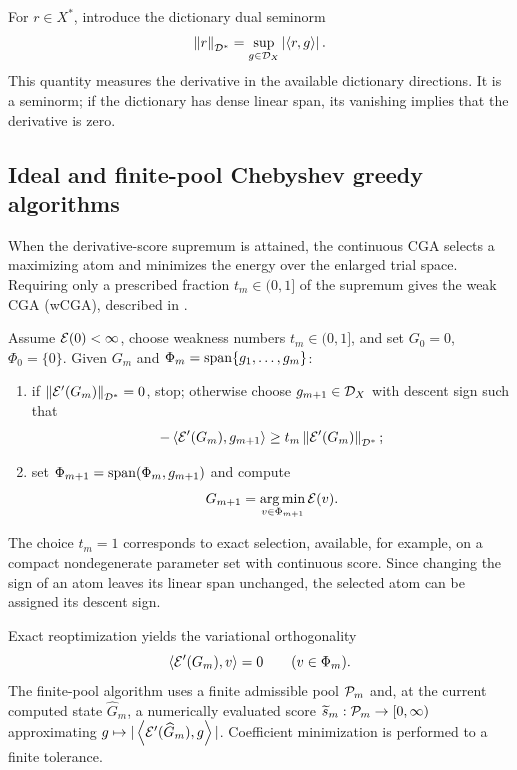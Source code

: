 For \(r\in X^*\), introduce the dictionary dual seminorm
\[
  \left\lVert r\right\rVert_{\mathcal{D}^*}=\sup_{g\in\mathcal{D}_X}\left|\left\langle r,g\right\rangle\right|.
\]
This quantity measures the derivative in the available dictionary directions. It is a seminorm;
if the dictionary has dense linear span, its vanishing implies that the derivative is zero.

\subsection{Ideal and finite-pool Chebyshev greedy algorithms}

When the derivative-score supremum is attained, the continuous CGA
selects a maximizing atom and minimizes the energy over the enlarged
trial space. Requiring only a prescribed fraction \(t_m\in(0,1]\) of
the supremum gives the weak CGA (wCGA), described in
.

\begin{algorithm}[htbp]
\caption{Continuous weak Chebyshev greedy algorithm}
\label{alg:continuous}
Assume \(\mathcal{E}(0)<\infty\), choose weakness numbers \(t_m\in(0,1]\), and set
\(G_0=0\), \(\Phi_0=\{0\}\). Given
\(G_m\) and \(\Phi_m=\operatorname{span}\{g_1,\ldots,g_m\}\):
\begin{enumerate}[label=\textup{(\roman*)}]
  \item if \(\left\lVert \mathcal{E}'(G_m)\right\rVert_{\mathcal{D}^*}=0\), stop; otherwise choose \(g_{m+1}\in\mathcal{D}_X\) with descent sign such that
  \[
  -\left\langle \mathcal{E}'(G_m),g_{m+1}\right\rangle
  \geq t_m\left\lVert \mathcal{E}'(G_m)\right\rVert_{\mathcal{D}^*};
  \]
  \item set \(\Phi_{m+1}=\operatorname{span}(\Phi_m,g_{m+1})\) and compute
  \[
    G_{m+1}=\operatorname*{arg\,min}_{v\in\Phi_{m+1}}\mathcal{E}(v).
  \]
\end{enumerate}
\end{algorithm}

The choice \(t_m=1\) corresponds to exact selection, available, for
example, on a compact nondegenerate parameter set with continuous
score. Since changing the sign of an atom leaves its linear span
unchanged, the selected atom can be assigned its descent sign.

Exact reoptimization yields the variational orthogonality
\begin{equation}
 \left\langle \mathcal{E}'(G_m),v\right\rangle=0\qquad(v\in\Phi_m).
 \label{eq:orthogonality}
\end{equation}
The finite-pool algorithm uses a finite admissible pool \(\mathcal{P}_m\)
and, at the current computed state \(\widehat G_m\), a numerically
evaluated score \(\widetilde s_m:\mathcal{P}_m\to[0,\infty)\) approximating
\(g\mapsto|\left\langle \mathcal{E}'(\widehat G_m),g\right\rangle|\). Coefficient minimization is
performed to a finite tolerance.

